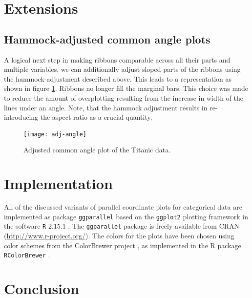 \section{Extensions}
\subsection{Hammock-adjusted common angle plots}
A logical next step in making ribbons comparable across all their parts and multiple variables, we can additionally adjust sloped parts of the ribbons using the hammock-adjustment described above. This leads to a representation as shown in figure \ref{adj.angle}. Ribbons no longer fill the marginal bars. This choice was made to reduce the amount of overplotting resulting from the increase in width of the lines under an angle. Note, that the hammock adjustment results in re-introducing the aspect ratio as a crucial quantity. 
\begin{figure}[hbtp]
\texttt{[image: adj-angle]}
\caption{Adjusted common angle plot of the Titanic data.}
\label{adj.angle}
\end{figure}
\section{Implementation}

All  of the discussed variants of parallel coordinate plots for categorical data are implemented as package {\tt ggparallel} based on the {\tt ggplot2} \cite{ggplot2} plotting framework in the software {\tt R} 2.15.1 \citep{R}. The  {\tt ggparallel} package is freely available from CRAN (\url{http://www.r-project.org/}).
The colors for the plots have been chosen using color schemes from the ColorBrewer project  \cite{colorbrewer} , as implemented in the R package {\tt RColorBrewer}  \cite{RColorBrewer} .


\section{Conclusion}





